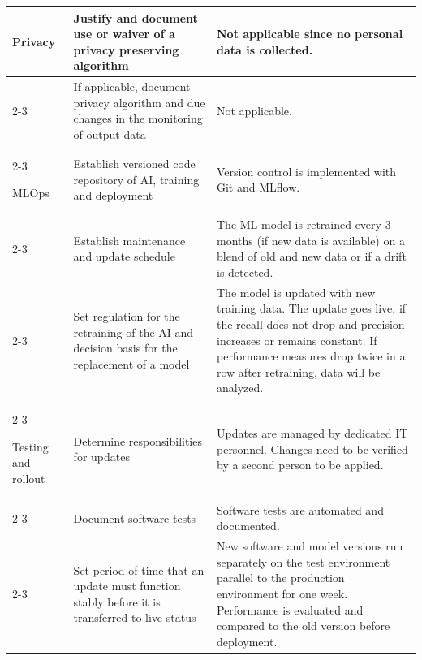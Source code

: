 {\begin{longtable}{p{0.15\linewidth}|p{0.35\linewidth}p{0.5\linewidth}}
    \hline
    Privacy                         
        & Justify and document use or waiver of a privacy preserving algorithm & Not applicable since no personal data is collected.\\\cline{2-3}
        & If applicable, document privacy algorithm and due changes in the monitoring of output data & Not applicable.\\\cline{2-3}
    
    \hline
    MLOps                           
        & Establish versioned code repository of AI, training and deployment & Version control is implemented with Git and MLflow.\\\cline{2-3}
        & Establish maintenance and update schedule & The ML model is retrained every 3 months (if new data is available) on a blend of old and new data or if a drift is detected.\\\cline{2-3}
        & Set regulation for the retraining of the AI and decision basis for the replacement of a model & The model is updated with new training data. The update goes live, if the recall does not drop and precision increases or remains constant. If performance measures drop twice in a row after retraining, data will be analyzed.\\\cline{2-3}
    
    \hline
    Testing and rollout             
        & Determine responsibilities for updates & Updates are managed by dedicated IT personnel. Changes need to be verified by a second person to be applied.\\\cline{2-3}
        & Document software tests & Software tests are automated and documented.\\\cline{2-3}
        & Set period of time that an update must function stably before it is transferred to live status & New software and model versions run separately on the test environment parallel to the production environment for one week. Performance is evaluated and compared to the old version before deployment.\\
                                    
    \bottomrule
\end{longtable}
}